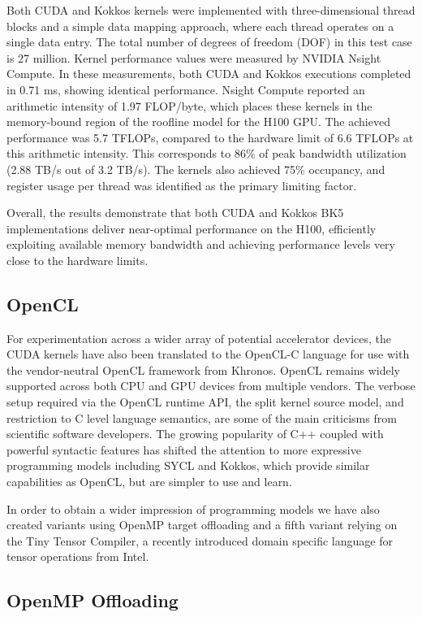\documentclass[a4paper,12pt]{article}
\begin{document}
Both CUDA and Kokkos kernels were implemented with three-dimensional thread blocks and a simple data mapping approach, where each thread operates on a single data entry. The total number of degrees of freedom (DOF) in this test case is 27 million. Kernel performance values were measured by NVIDIA Nsight Compute. In these measurements, both CUDA and Kokkos executions completed in 0.71 ms, showing identical performance. Nsight Compute reported an arithmetic intensity of 1.97 FLOP/byte, which places these kernels in the memory-bound region of the roofline model for the H100 GPU. The achieved performance was 5.7 TFLOPs, compared to the hardware limit of 6.6 TFLOPs at this arithmetic intensity. This corresponds to 86\% of peak bandwidth utilization (2.88 TB/s out of 3.2 TB/s). The kernels also achieved 75\% occupancy, and register usage per thread was identified as the primary limiting factor.

Overall, the results demonstrate that both CUDA and Kokkos BK5 implementations deliver near-optimal performance on the H100, efficiently exploiting available memory bandwidth and achieving performance levels very close to the hardware limits.

\subsection{OpenCL}

For experimentation across a wider array of potential accelerator devices, the CUDA kernels have also been translated to the OpenCL-C language for use with the vendor-neutral OpenCL framework from Khronos.
OpenCL remains widely supported across both CPU and GPU devices from multiple vendors.
The verbose setup required via the OpenCL runtime API, the split kernel source model, and restriction to C level language semantics, are some of the main criticisms from scientific software developers. 
The growing popularity of C++ coupled with powerful syntactic features has shifted the attention to more expressive programming models including SYCL and Kokkos, which provide similar capabilities as OpenCL, but are simpler to use and learn. 

In order to obtain a wider impression of programming models we have also created variants using OpenMP target offloading and a fifth variant relying on the Tiny Tensor Compiler, a recently introduced domain specific language for tensor operations from Intel. 



\subsection{OpenMP Offloading}
\end{document}
